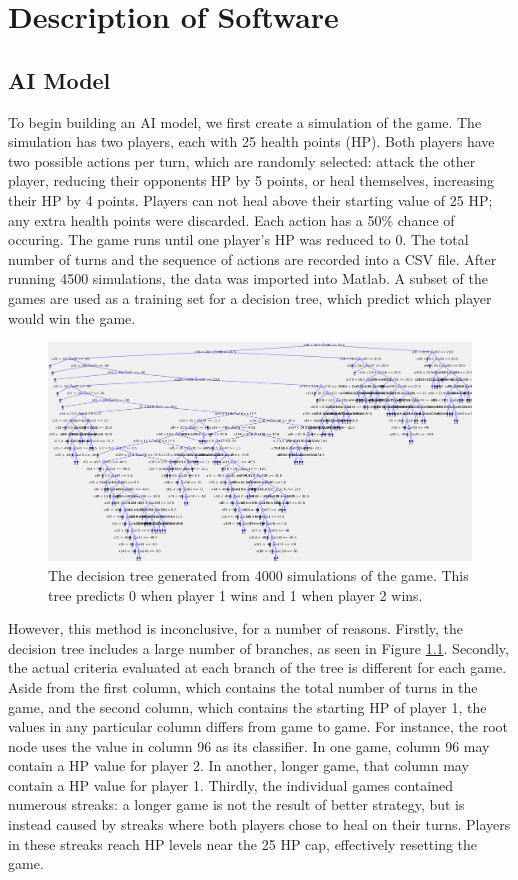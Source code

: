 \chapter{Description of Software}
\section{AI Model}
To begin building an AI model, we first create a simulation of the game. The simulation has two players, each with 25 health points (HP). Both players have two possible actions per turn, which are randomly selected: attack the other player, reducing their opponents HP by 5 points, or heal themselves, increasing their HP by 4 points. Players can not heal above their starting value of 25 HP; any extra health points were discarded. Each action has a 50\% chance of occuring. The game runs until one player's HP was reduced to 0. The total number of turns and the sequence of actions are recorded into a CSV file. After running 4500 simulations, the data was imported into Matlab. A subset of the games are used as a training set for a decision tree, which predict which player would win the game.\\

\begin{figure}[H]
  \centering
  \includegraphics[width=12cm]{figures/firstDecisionTree.png}
  \caption{The decision tree generated from 4000 simulations of the game. This tree predicts 0 when player 1 wins and 1 when player 2 wins.}
  \label{fig:decisionTree1}
\end{figure}

However, this method is inconclusive, for a number of reasons. Firstly, the decision tree includes a large number of branches, as seen in Figure \ref{fig:decisionTree1}. Secondly, the actual criteria evaluated at each branch of the tree is different for each game. Aside from the first column, which contains the total number of turns in the game, and the second column, which contains the starting HP of player 1, the values in any particular column differs from game to game. For instance, the root node uses the value in column 96 as its classifier. In one game, column 96 may contain a HP value for player 2. In another, longer game, that column may contain a HP value for player 1. Thirdly, the individual games contained numerous streaks: a longer game is not the result of better strategy, but is instead caused by streaks where both players chose to heal on their turns. Players in these streaks reach HP levels near the 25 HP cap, effectively resetting the game.

